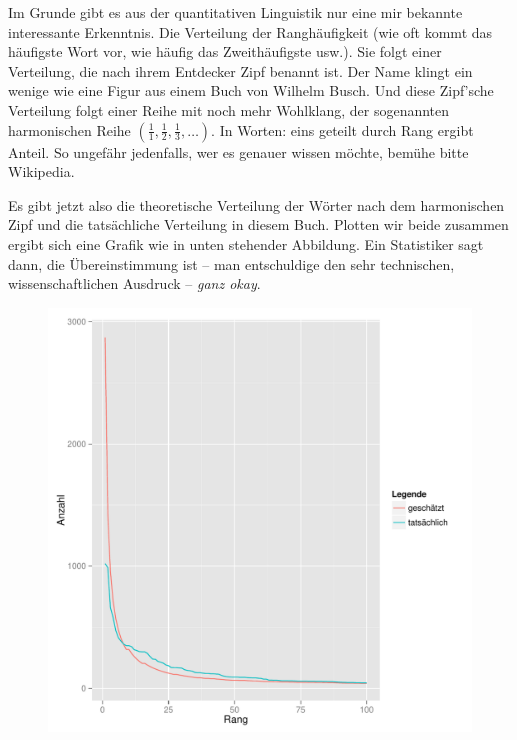 Im Grunde gibt es aus der quantitativen Linguistik nur eine mir bekannte
interessante Erkenntnis. Die Verteilung der Ranghäufigkeit (wie oft kommt das
häufigste Wort vor, wie häufig das Zweithäufigste usw.). Sie folgt einer Verteilung,
die nach ihrem Entdecker Zipf benannt ist. Der Name klingt ein wenige wie eine
Figur aus einem Buch von Wilhelm Busch. Und diese Zipf'sche Verteilung folgt einer Reihe mit noch mehr Wohlklang,
der sogenannten harmonischen Reihe
$\left(\frac{1}{1},\frac{1}{2},\frac{1}{3},\dots\right)$. In Worten: eins
geteilt durch Rang ergibt Anteil. So ungefähr jedenfalls, wer es genauer wissen
möchte, bemühe bitte Wikipedia.

Es gibt jetzt also die theoretische Verteilung der Wörter nach dem harmonischen
Zipf und die tatsächliche Verteilung
in diesem Buch. Plotten wir beide zusammen ergibt sich eine Grafik wie in unten
stehender
Abbildung. Ein Statistiker sagt dann, die Übereinstimmung ist -- man
entschuldige den sehr technischen, wissenschaftlichen Ausdruck -- \emph{ganz
okay}.

\begin{figure}[ht]
\centering
	\includegraphics[height=.6\textheight,width=\textwidth]{tinaStat/zipfAlle.pdf}
	\label{dend1}
\end{figure}
